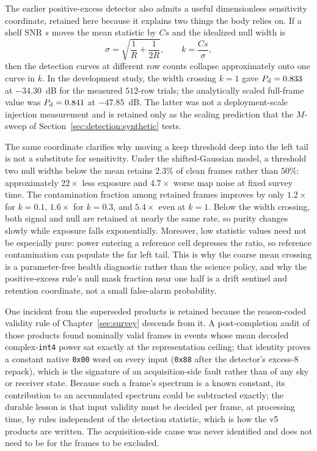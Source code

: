 The earlier positive-excess detector also admits a useful dimensionless
sensitivity coordinate, retained here because it explains two things the body
relies on.  If a shelf SNR $s$ moves the mean statistic by $C s$ and the
idealized null width is
\begin{equation}
  \sigma = \sqrt{\frac{1}{R}+\frac{1}{2R}},
  \qquad k = \frac{Cs}{\sigma},
\end{equation}
then the detection curves at different row counts collapse approximately onto
one curve in $k$.  In the development study, the width crossing $k=1$ gave
$P_{\rm d}=0.833$ at $-34.30$~dB for the measured $512$-row trials; the
analytically scaled full-frame value was $P_{\rm d}=0.841$ at $-47.85$~dB.
The latter was not a deployment-scale injection measurement and is retained
only as the scaling prediction that the $M$-sweep of
Section~\ref{sec:detection:synthetic} tests.

The same coordinate clarifies why moving a keep threshold deep into the left
tail is not a substitute for sensitivity.  Under the shifted-Gaussian model, a
threshold two null widths below the mean retains $2.3\%$ of clean frames rather
than $50\%$: approximately $22\times$ less exposure and $4.7\times$ worse map
noise at fixed survey time.  The contamination fraction among retained frames
improves by only $1.2\times$ for $k=0.1$, $1.6\times$ for $k=0.3$, and
$5.4\times$ even at $k=1$.  Below the width crossing, both signal and null are
retained at nearly the same rate, so purity changes slowly while exposure falls
exponentially.  Moreover, low statistic values need not be especially pure:
power entering a reference cell depresses the ratio, so reference contamination
can populate the far left tail.  This is why the coarse mean crossing is a
parameter-free health diagnostic rather than the science policy, and why the
positive-excess rule's null mask fraction near one half is a drift sentinel and
retention coordinate, not a small false-alarm probability.

One incident from the superseded products is retained because the
reason-coded validity rule of Chapter~\ref{sec:survey} descends from it.  A
post-completion audit of those products found  nominally valid
frames in  events whose mean decoded complex-\texttt{int4} power
sat exactly at the representation ceiling; that identity proves a constant
native \texttt{0x00} word on every input (\texttt{0x88} after the detector's
excess-8 repack), which is the signature of an acquisition-side fault rather
than of any sky or receiver state.  Because such a frame's spectrum is a known
constant, its contribution to an accumulated spectrum could be subtracted
exactly; the durable lesson is that input validity must be decided per frame,
at processing time, by rules independent of the detection statistic, which is
how the v5 products are written.  The acquisition-side cause was never
identified and does not need to be for the frames to be excluded.

